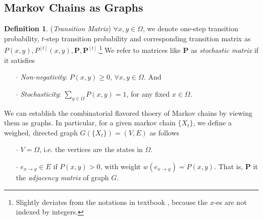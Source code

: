 \documentclass[a4paper, 11pt]{article}
\theoremstyle{definition}
\newtheorem{definition}{Definition}
\begin{document}
\subsection{Markov Chains as Graphs}
\begin{definition} (\textit{Transition Matrix}) $\forall x, y\in \Omega$, we denote one-step transition probability, $t$-step transition probability and corresponding transition matrix as $P(x,y), P^{[t]}(x,y), \bm{P}, \bm{P}^{[t]}$.\footnote{Slightly deviates from the notations in textbook \cite{ross}, because the $x$-es are not indexed by integers.} We refer to matrices like $\bm{P}$ as \textit{stochastic matrix} if it satisfies
\begin{itemize}
	\item[$\cdot$] \textit{Non-negativity}: $P(x,y)\geq 0$, $\forall x,y\in\Omega$. And
	\item[$\cdot$] \textit{Stochasticity}: $\sum_{y\in \Omega}P(x,y)=1$, for any fixed $x\in \Omega$. 
\end{itemize}
\end{definition}
We can establish the combinatorial flavored thoery of Markov chains by viewing them as graphs. In particular, for a given markov chain $\{X_t\}$, we define a weighed, directed graph $G(\{X_t\})=(V,E)$ as follows
\begin{itemize}
	\item[$\cdot$] $V=\Omega$, i.e. the vertices are the states in $\Omega$.
	\item[$\cdot$] $e_{x\to y} \in E$ if $P(x,y)>0$, with weight $w(e_{x\to y})=P(x,y)$. That is, $\bm{P}$ it the \textit{adjacency matrix} of graph $G$.
\end{itemize}
\end{document}
